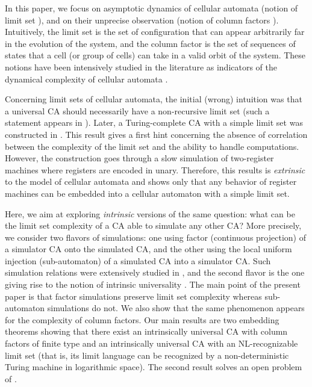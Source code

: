 \documentclass{jac}
\theoremstyle{definition}
\begin{document}
In this paper, we focus on asymptotic dynamics of cellular automata (notion of limit set \cite{cpyu}), and on their unprecise observation (notion of column factors \cite{classif}). Intuitively, the limit set is the set of configuration that can appear arbitrarily far in the evolution of the system, and the column factor is the set of sequences of states that a cell (or group of cells) can take in a valid orbit of the system. These notions have been intensively studied in the literature as indicators of the dynamical complexity of cellular automata \cite{langlim2,rice,oexp,utrace}. 

Concerning limit sets of cellular automata, the initial (wrong) intuition was that a universal CA should necessarily have a non-recursive limit set (such a statement appears in \cite{cpyu}). Later, a Turing-complete CA with a simple limit set was constructed in \cite{limuniv}. This result gives a first hint concerning the absence of correlation between the complexity of the limit set and the ability to handle computations. However, the construction goes through a slow simulation of two-register machines where registers are encoded in unary. Therefore, this results is \textit{extrinsic} to the model of cellular automata and shows only that any behavior of register machines can be embedded into a cellular automaton with a simple limit set.

Here, we aim at exploring \textit{intrinsic} versions of the same question: what can be the limit set complexity of a CA able to simulate any other CA? More precisely, we consider two flavors of simulations: one using factor (continuous projection) of a simulator CA onto the simulated CA, and the other using the local uniform injection (sub-automaton) of a simulated CA into a simulator CA. Such simulation relations were extensively studied in \cite{bulk2}, and the second flavor is the one giving rise to the notion of intrinsic universality \cite{ollinger,bulk2}. The main point of the present paper is that factor simulations preserve limit set complexity whereas sub-automaton simulations do not. We also show that the same phenomenon appears for the complexity of column factors. Our main results are two embedding theorems showing that there exist an intrinsically universal CA with column factors of finite type and an intrinsically universal CA with an NL-recognizable limit set (that is, its limit language can be recognized by a non-deterministic Turing machine in logarithmic space). The second result solves an open problem of \cite{theyssier}.
\end{document}
